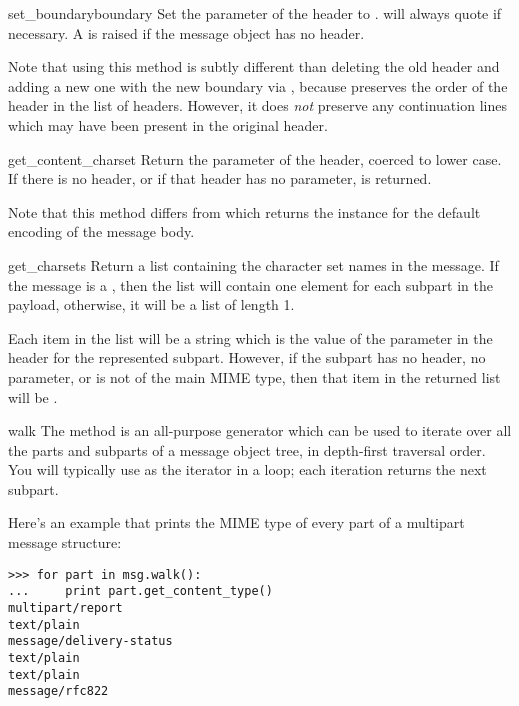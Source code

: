\begin{methoddesc}[Message]{set_boundary}{boundary}
Set the  parameter of the 
header to .   will always quote
 if necessary.  A  is raised
if the message object has no  header.

Note that using this method is subtly different than deleting the old
 header and adding a new one with the new boundary
via , because  preserves the
order of the  header in the list of headers.
However, it does \emph{not} preserve any continuation lines which may
have been present in the original  header.
\end{methoddesc}

\begin{methoddesc}[Message]{get_content_charset}{}
Return the  parameter of the 
header, coerced to lower case.  If there is no
 header, or if that header has no
 parameter,  is returned.

Note that this method differs from  which
returns the  instance for the default encoding of the
message body.

\end{methoddesc}

\begin{methoddesc}[Message]{get_charsets}{}
Return a list containing the character set names in the message.  If
the message is a , then the list will contain one
element for each subpart in the payload, otherwise, it will be a list
of length 1.

Each item in the list will be a string which is the value of the
 parameter in the  header for the
represented subpart.  However, if the subpart has no
 header, no  parameter, or is not of
the  main MIME type, then that item in the returned list
will be .
\end{methoddesc}

\begin{methoddesc}[Message]{walk}{}
The  method is an all-purpose generator which can be
used to iterate over all the parts and subparts of a message object
tree, in depth-first traversal order.  You will typically use
 as the iterator in a  loop; each
iteration returns the next subpart.

Here's an example that prints the MIME type of every part of a
multipart message structure:

\begin{verbatim}
>>> for part in msg.walk():
...     print part.get_content_type()
multipart/report
text/plain
message/delivery-status
text/plain
text/plain
message/rfc822
\end{verbatim}
\end{methoddesc}


